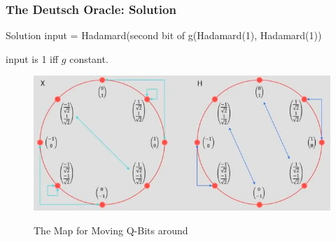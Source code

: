 \documentclass{beamer}
\begin{document}
\begin{frame}
\frametitle{The Deutsch Oracle: Solution}

\begin{block}{Solution}
input = Hadamard(second bit of g(Hadamard(1), Hadamard(1))

input is 1 iff $g$ constant.
\end{block}

\begin{figure}
    \centering
    \includegraphics[width=.75\linewidth]{qt-unit-circle.jpg}
    \label{fig:qt-unit-circle}
    \caption{The Map for Moving Q-Bits around}
\end{figure}
\end{frame}
\end{document}
